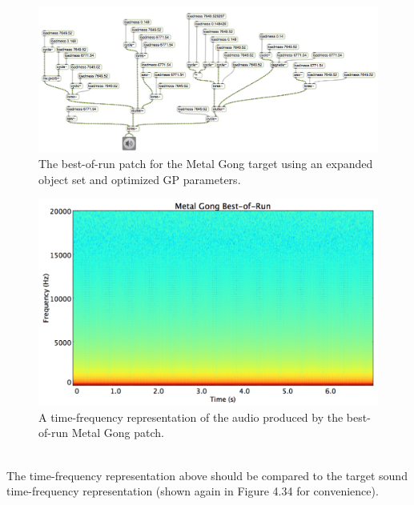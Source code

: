 \documentclass[a4paper,12pt]{report} 	%
\numberwithin{figure}{chapter}
\numberwithin{table}{chapter}
\numberwithin{equation}{chapter}
\begin{document}
\begin{flushleft}
\begin{figure}[h!]
\begin{center}
\includegraphics[angle=270, scale=0.45]{MetalGong_Best}
\caption[Metal Gong Best-of-Run Patch]{The best-of-run patch for the Metal Gong target using an expanded object set and optimized GP parameters.}
\end{center}
\end{figure}
\begin{figure}[h!]
\begin{center}
\includegraphics[scale=0.35,width=\linewidth]{MetalGongBestOfRunSTFT}
\caption[Best-of-Run Metal Gong Time-Frequency Representation]{A time-frequency representation of the audio produced by the best-of-run Metal Gong patch.}
\end{center}
\end{figure}
\\
The time-frequency representation above should be compared to the target sound time-frequency representation (shown again in Figure 4.34 for convenience).
\begin{figure}[h!]
\begin{center}

\end{center}
\end{figure}
\end{flushleft}
\end{document}
